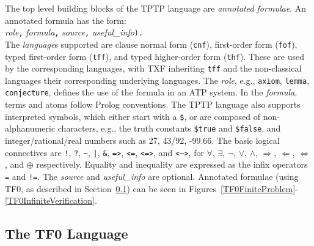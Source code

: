 \documentclass[letterpaper]{article}
\newcommand{\smalltt}[1]{\small \texttt{#1}}
\begin{document}
The top level building blocks of the TPTP language are {\em annotated
formulae}.
An annotated formula has the form:\\
{\em role}{\tt ,}
{\em formula}{\tt ,}
{\em source}{\tt ,}
{\em useful\_info}{\tt ).}\\
The {\em language}s supported are clause normal form (\smalltt{cnf}), first-order form 
(\smalltt{fof}), typed first-order form (\smalltt{tff}), and typed higher-order form 
(\smalltt{thf}).
These are used by the corresponding languages, with TXF inheriting {\tt tff} and the non-classical 
languages their corresponding underlying languages.
The {\em role}, e.g., \smalltt{axiom}, \smalltt{lemma}, \smalltt{conjecture},
defines the use of the formula in an ATP system.
In the {\em formula}, terms and atoms follow Prolog conventions.
The TPTP language also supports interpreted symbols, which either start with a
{\tt \$}, or are composed of non-alphanumeric characters, e.g., the truth
constants \smalltt{\$true} and \smalltt{\$false}, and integer/rational/real
numbers such as 27, 43/92, -99.66.
The basic logical connectives are
{\tt !}, {\tt ?}, {\tt \verb|~|}, {\tt |}, {\tt \&}, {\tt =>}, {\tt <=},
{\tt <=>}, and {\tt <\verb|~|>},
for
$\forall$, $\exists$, $\neg$, $\vee$, $\wedge$, $\Rightarrow$, $\Leftarrow$,
$\Leftrightarrow$, and $\oplus$ respectively.
Equality and inequality are expressed as the infix operators {\tt =} and
{\tt !=}.
The {\em source} and {\em useful\_info} are optional.
Annotated formulae (using TF0, as described in Section~\ref{TF0}) can be seen in 
Figures~\ref{TF0FiniteProblem}-\ref{TF0InfiniteVerification}.

\subsection{The TF0 Language}
\label{TF0}
\end{document}
